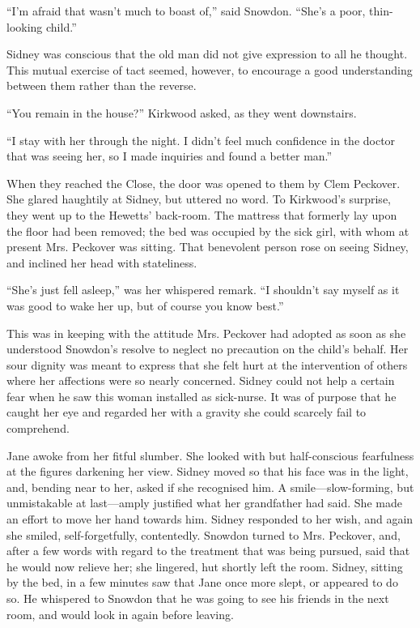 ``I'm afraid that wasn't much to boast of,'' said Snowdon. ``She's a
poor, thin-looking child.''

Sidney was conscious that the old man did not give expression to all he
thought. This mutual exercise of tact seemed, however, to {}encourage a
good understanding between them rather than the reverse.

``You remain in the house?'' Kirkwood asked, as they went downstairs.

``I stay with her through the night. I didn't feel much confidence in
the doctor that was seeing her, so I made inquiries and found a better
man.''

When they reached the Close, the door was opened to them by Clem
Peckover. She glared haughtily at Sidney, but uttered no word. To
Kirkwood's surprise, they went up to the Hewetts' back-room. The
mattress that formerly lay upon the floor had been removed; the bed was
occupied by the sick girl, with whom at present Mrs. Peckover was
sitting. That benevolent person rose on seeing Sidney, and inclined her
head with stateliness.

``She's just fell asleep,'' was her whispered remark. ``I shouldn't say
myself as it was good to wake her up, but of course you know best.''

This was in keeping with the attitude Mrs. {}Peckover had adopted as
soon as she understood Snowdon's resolve to neglect no precaution on the
child's behalf. Her sour dignity was meant to express that she felt hurt
at the intervention of others where her affections were so nearly
concerned. Sidney could not help a certain fear when he saw this woman
installed as sick-nurse. It was of purpose that he caught her eye and
regarded her with a gravity she could scarcely fail to comprehend.

Jane awoke from her fitful slumber. She looked with but half-conscious
fearfulness at the figures darkening her view. Sidney moved so that his
face was in the light, and, bending near to her, asked if she recognised
him. A smile---slow-forming, but unmistakable at last---amply justified
what her grandfather had said. She made an effort to move her hand
towards him. Sidney responded to her wish, and again she smiled,
self-forgetfully, contentedly. Snowdon turned to Mrs. Peckover, and,
after a few words with regard to the {}treatment that was being pursued,
said that he would now relieve her; she lingered, hut shortly left the
room. Sidney, sitting by the bed, in a few minutes saw that Jane once
more slept, or appeared to do so. He whispered to Snowdon that he was
going to see his friends in the next room, and would look in again
before leaving.

